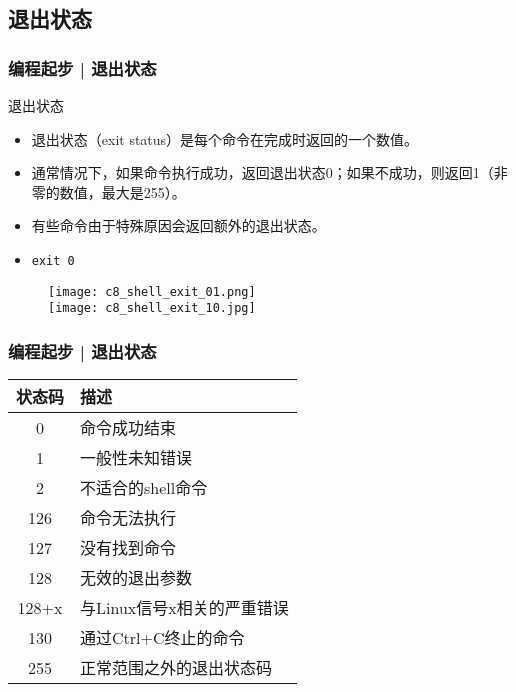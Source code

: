 \subsection{退出状态}
\begin{frame}[fragile]
  \frametitle{编程起步 | \alert{退出状态}}
  \begin{block}{退出状态}
    \begin{itemize}
      \item 退出状态（exit status）是每个命令在完成时返回的一个数值。
      \item 通常情况下，如果命令执行成功，返回退出状态0；如果不成功，则返回1（非零的数值，最大是255）。
      \item 有些命令由于特殊原因会返回额外的退出状态。
      \item \verb|exit 0|
    \end{itemize}
  \end{block}
  \vspace{-0.3cm}
  \begin{figure}
    \centering
    \texttt{[image: c8\_shell\_exit\_01.png]}\\
    \texttt{[image: c8\_shell\_exit\_10.jpg]}
  \end{figure}
\end{frame}

\begin{frame}[fragile]
  \frametitle{编程起步 | \alert{退出状态}}
  \begin{table}
    \centering
    \begin{tabularx}{0.65\textwidth}{cX}
      \hline
      \rowcolor{blue!50}状态码 & 描述\\
      \hline
      0 & 命令成功结束\\
      1 & 一般性未知错误\\
      2 & 不适合的shell命令\\
      126 & 命令无法执行\\
      127 & 没有找到命令\\
      128 & 无效的退出参数\\
      128+x & 与Linux信号x相关的严重错误\\
      130 & 通过Ctrl+C终止的命令\\
      255 & 正常范围之外的退出状态码\\
      \hline
    \end{tabularx}
  \end{table}
\end{frame}

